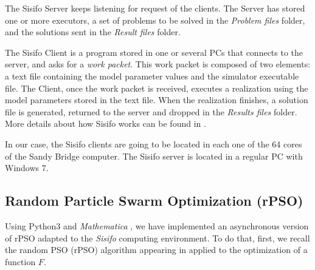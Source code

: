 The Sisifo Server keeps listening for request of the clients. The Server has stored one or more executors, a set of problems to be solved in the \textit{Problem files} folder, and the solutions sent in the \textit{Result files} folder. 

The Sisifo Client is a program stored in one or several PCs that connects to the server, and asks for a \textit{work packet}. This work packet is composed of two elements: a text file containing the model parameter values and the simulator executable file. The Client, once the work packet is received, executes a realization using the model parameters stored in the text file. When the realization finishes, a solution file is generated, returned to the server and dropped in the \textit{Results files} folder. More details about how Sisifo works can be found in \cite{villanueva2013epidemic}.

In our case, the Sisifo clients are going to be located in each one of the 64 cores of the Sandy Bridge computer. The Sisifo server is located in a regular PC with Windows 7.

\subsection{Random Particle Swarm Optimization (rPSO)}
Using Python3 \cite{python3} and \textit{Mathematica} \cite{Mathematica}, we have implemented an asynchronous version of rPSO adapted to the  \textit{Sisifo} computing environment. To do that, first, we recall the random PSO (rPSO) algorithm appearing in \cite{khemka2008exploratory} applied to the optimization of a function $F$.

